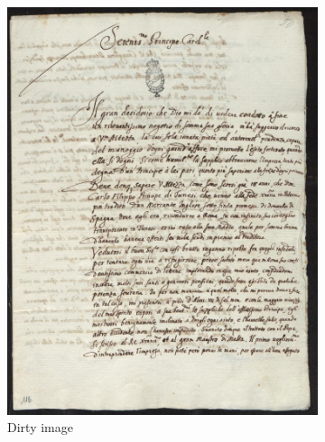 \documentclass[%
 reprint,
 amsmath,amssymb,
 aps,
]{revtex4-1}
\begin{document}
\begin{figure}%
\centering
\begin{subfigure}{.9\columnwidth}
\includegraphics[width=\columnwidth]{35}%
\caption{Dirty image}%
\label{subfiga}%
\end{subfigure}\hfill%
\begin{subfigure}{.9\columnwidth}

\end{subfigure}
\end{figure}
\end{document}
